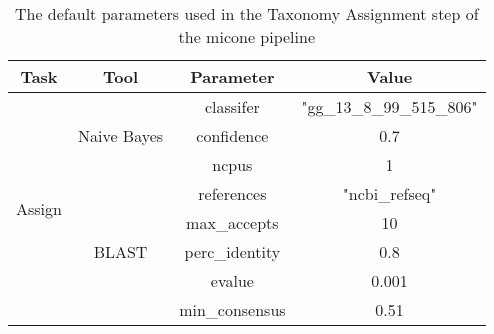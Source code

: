 \begin{table}[H]
\centering
\small
\begin{tabular}{|c|c|c|c|}
\hline
\textbf{Task}           & \textbf{Tool}                & \textbf{Parameter} & \textbf{Value}            \\ \hline
\multirow{8}{*}{Assign} & \multirow{3}{*}{Naive Bayes} & classifer          & "gg\_13\_8\_99\_515\_806" \\
                        &                              & confidence         & 0.7                       \\
                        &                              & ncpus              & 1                         \\ \cline{2-4}
                        & \multirow{5}{*}{BLAST}       & references         & "ncbi\_refseq"            \\
                        &                              & max\_accepts       & 10                        \\
                        &                              & perc\_identity     & 0.8                       \\
                        &                              & evalue             & 0.001                     \\
                        &                              & min\_consensus     & 0.51                      \\ \hline
\end{tabular}
\caption{The default parameters used in the Taxonomy Assignment step of the \ac{micone} pipeline}
\label{tab:ta_parameters}
\end{table}


